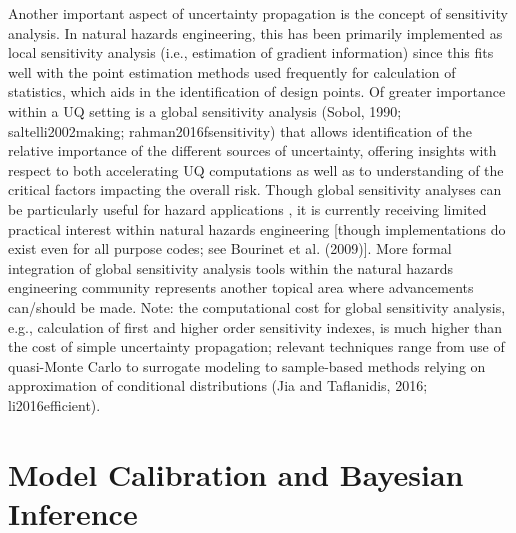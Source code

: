 Another important aspect of uncertainty propagation is the concept of sensitivity analysis. In natural hazards engineering, this has been primarily implemented as local sensitivity analysis (i.e., estimation of gradient information) since this fits well with the point estimation methods used frequently for calculation of statistics, which aids in the identification of design points. Of greater importance within a UQ setting is a global sensitivity analysis (Sobol, 1990; saltelli2002making; rahman2016fsensitivity) that allows identification of the relative importance of the different sources of uncertainty, offering insights with respect to both accelerating UQ computations as well as to understanding of the critical factors impacting the overall risk. Though global sensitivity analyses can be particularly useful for hazard applications \citep{vetter2012global}, it is currently receiving limited practical interest within natural hazards engineering [though implementations do exist even for all purpose codes; see Bourinet et al. (2009)]. More formal integration of global sensitivity analysis tools within the natural hazards engineering community represents another topical area where advancements can/should be made. Note: the computational cost for global sensitivity analysis, e.g., calculation of first and higher order sensitivity indexes, is much higher than the cost of simple uncertainty propagation; relevant techniques range from use of quasi-Monte Carlo \citep{saltelli2002making} to surrogate modeling \citep{sudret2008global} to sample-based methods relying on approximation of conditional distributions (Jia and Taflanidis, 2016; li2016efficient).

\section{Model Calibration and Bayesian Inference}
\label{sec:uq_calibration}

